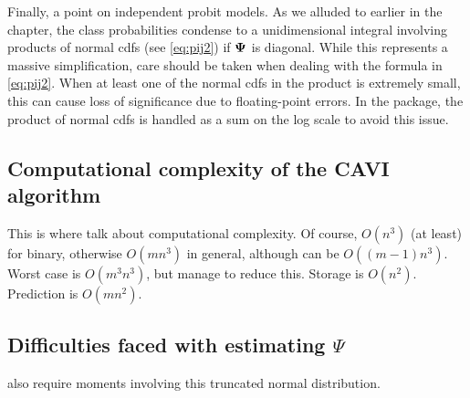 Finally, a point on independent probit models.
As we alluded to earlier in the chapter, the class probabilities condense to a unidimensional integral involving products of normal cdfs (see \cref{eq:pij2}) if ${\bm\Psi}$ is diagonal.
While this represents a massive simplification, care should be taken when dealing with the formula in \cref{eq:pij2}.
When at least one of the normal cdfs in the product is extremely small, this can cause loss of significance due to floating-point errors.
In the  package, the product of normal cdfs is handled as a sum on the log scale to avoid this issue.

\subsection{Computational complexity of the CAVI algorithm}

This is where talk about computational complexity.
Of course, $O(n^3)$ (at least) for binary, otherwise $O(mn^3)$ in general, although can be $O((m-1)n^3)$.
Worst case is $O(m^3n^3)$, but manage to reduce this.
Storage is $O(n^2)$. 
Prediction is $O(mn^2)$.

\subsection{Difficulties faced with estimating $\Psi$}

also require moments involving this truncated normal distribution. 